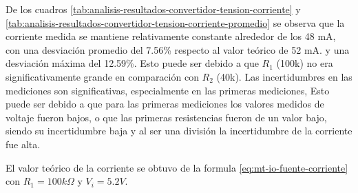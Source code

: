 De los cuadros \ref{tab:analisis-resultados-convertidor-tension-corriente} y \ref{tab:analisis-resultados-convertidor-tension-corriente-promedio} se observa que la corriente medida se mantiene relativamente constante alrededor de los 48 mA, con una desviación promedio del 7.56\% respecto al valor teórico de 52 mA. y una desviación máxima del 12.59\%. Esto puede ser debido a que $R_1$ (100k) no era significativamente grande en comparación con $R_2$ (40k). Las incertidumbres en las mediciones son significativas, especialmente en las primeras mediciones, Esto puede ser debido a que para las primeras mediciones los valores medidos de voltaje fueron bajos, o que las primeras resistencias fueron de un valor bajo, siendo su incertidumbre baja y al ser una división la incertidumbre de la corriente fue alta.

El valor teórico de la corriente se obtuvo de la formula \ref{eq:mt-io-fuente-corriente} con $R_1 = 100k\Omega$ y $V_i = 5.2V$.